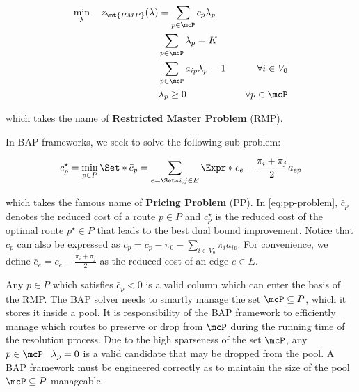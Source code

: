 \begin{align}
	\min_{\lambda} \quad z_\mt{RMP}(\lambda) & = \sum_{p \in \mcP}  c_p \lambda_p \label{eq:rmp-obj-func}                                                                                                                              \\
	                                         & \sum_{p \in \mcP} \lambda_{p} = K\label{eq:rmp-K-routes}                                                                                                                                \\
	                                         & \sum_{p \in \mcP}  a_{ip} \lambda_p = 1                    & \quad \forall i \in V_0                                              \label{eq:rmp-customers-visited-by-exactly-one-route} \\
	                                         & \lambda_p \ge 0                                            & \quad \forall p \in \mcP \label{eq:rmp-lambda-mip-var-bounds}
\end{align}

which takes the name of \textbf{Restricted Master Problem} (RMP).

In BAP frameworks, we seek to solve the following sub-problem:

\begin{equation}\label{eq:pp-problem}
	{c^\star_p} = \min_{p \in P} \Set*{ \bar{c}_p = \sum_{e = \Set*{i, j} \in E} \Expr*{c_{e} - \frac{\pi_i + \pi_j}{2}} a_{ep}  }
\end{equation}

which takes the famous name of \textbf{Pricing Problem} (PP).
In \cref{eq:pp-problem}, $\bar{c}_p$ denotes the reduced cost of a route $p \in P$
and $c^\star_p$ is the reduced cost of the optimal route $p^\star \in P$
that leads to the best dual bound improvement.
Notice that $\bar{c}_p$ can also be expressed as $\bar{c}_p = c_p - \pi_0 - \sum_{i \in V_0} \pi_i a_{ip}$.
For convenience,
we define $\bar{c}_{e} = c_{e} - \frac{\pi_i + \pi_j}{2}$
as the reduced cost of an edge $e\in E$.

Any $p \in P$ which satisfies $\bar{c}_p < 0$ is a valid column which can enter the basis of the RMP.
The BAP solver needs to smartly manage the set $\mcP \subseteq P$, which it stores it inside a pool.
It is responsibility of the BAP framework to efficiently manage which routes
to preserve or drop from $\mcP$ during the running time of the resolution process.
Due to the high sparseness of the set $\mcP$, any $p \in \mcP \mid \lambda_p = 0$
is a valid candidate that may be dropped from the pool.
A BAP framework must be engineered correctly as to maintain
the size of the pool $\mcP \subseteq P$ manageable.

